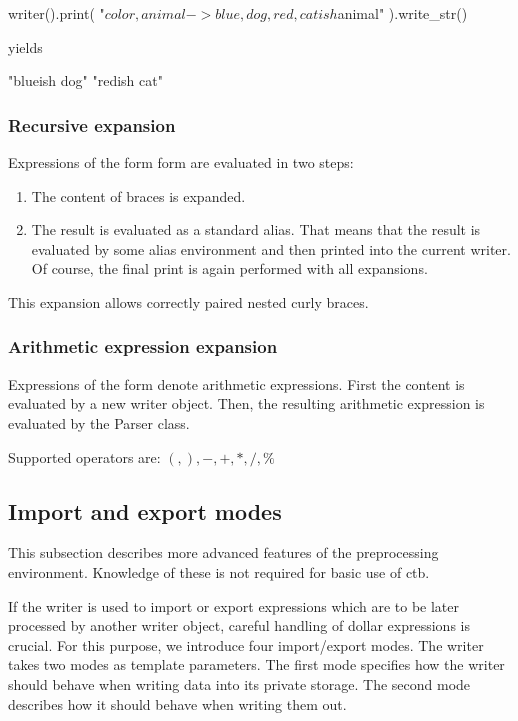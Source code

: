 \mybeginfig
\begin{code}
writer().print(
  "${ color,animal ->blue,dog,red,cat}ish $animal"
).write_str()
\end{code}
yields
\begin{code}
"blueish dog"
"redish cat"
\end{code}


\subsubsection{Recursive expansion}
Expressions of the form form  are evaluated in two steps:
\begin{enumerate}
  \item The content of braces is expanded.
  \item The result is evaluated as a standard alias. That means that the result is evaluated by some alias environment and then printed into the current writer. Of course, the final print is again performed with all expansions.
\end{enumerate}

This expansion allows correctly paired nested curly braces.

\subsubsection{Arithmetic expression expansion}

Expressions of the form  denote arithmetic expressions. First the content is evaluated by a new writer object. Then, the resulting arithmetic expression is evaluated by the Parser class.

Supported operators are: $(, ), -, +, *, /, \%$


\subsection*{Import and export modes}

\begin{rem}
  This subsection describes more advanced features of the preprocessing environment. Knowledge of these is not required for basic use of ctb.
\end{rem}

If the writer is used to import or export expressions which are to be later processed by another writer object, careful handling of dollar expressions is crucial. For this purpose, we introduce four import/export modes. The writer takes two modes as template parameters. The first mode specifies how the writer should behave when writing data into its private storage. The second mode describes how it should behave when writing them out.

